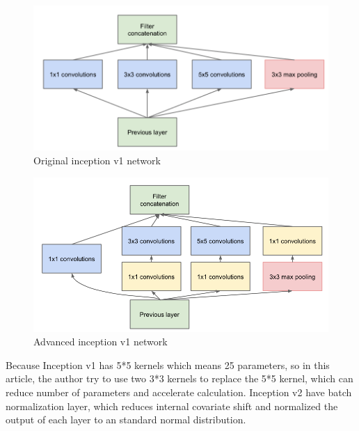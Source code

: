 \documentclass[10pt,twocolumn,letterpaper]{article}
\begin{document}
\begin{figure}[t]
	\begin{center}
		\includegraphics[width=0.8\linewidth]{Pic/18.jpg}
	\end{center}
	\caption{Original inception v1 network}
	 \label{fig:lojbknmng}
	\label{fig:onecol}
\end{figure}

\begin{figure}[t]
	\begin{center}
		\includegraphics[width=0.8\linewidth]{Pic/19.jpg}
	\end{center}
	\caption{Advanced inception v1 network}
	 \label{fig:long}
	\label{fig:onecol}
\end{figure} 

Because Inception v1 has 5*5 kernels which means 25 parameters, so in this article\cite{ioffe2015batch}, the author try to use two 3*3 kernels to replace the 5*5 kernel, which can reduce number of parameters and accelerate calculation. Inception v2 have batch normalization layer, which reduces internal covariate shift and normalized the output of each layer to an standard normal distribution.
\end{document}
